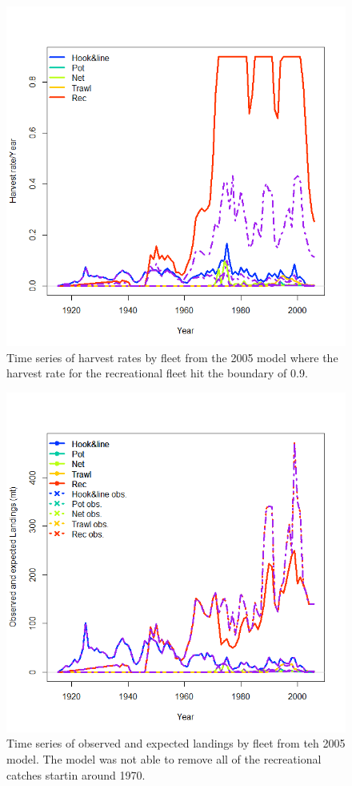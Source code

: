 \documentclass[12pt,]{article}
\begin{document}
\FloatBarrier

\begin{figure}[htbp]
\centering
\includegraphics{Figures/bridge_harvestrate.png}
\caption{Time series of harvest rates by fleet from the 2005 model where
the harvest rate for the recreational fleet hit the boundary of 0.9.
\label{fig:bridge_harvestrate}}
\end{figure}

\begin{figure}[htbp]
\centering
\includegraphics{Figures/bridge_catch.png}
\caption{Time series of observed and expected landings by fleet from teh
2005 model. The model was not able to remove all of the recreational
catches startin around 1970. \label{fig:bridge_catch}}
\end{figure}
\end{document}

